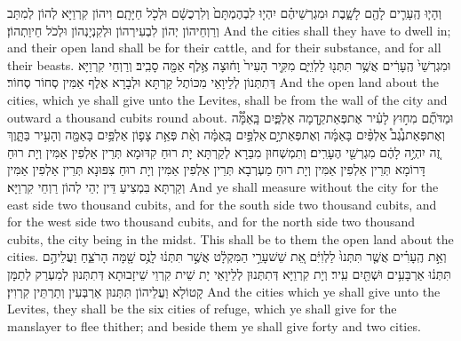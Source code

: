 {וְהָי֧וּ הֶֽעָרִ֛ים לָהֶ֖ם לָשָׁ֑בֶת וּמִגְרְשֵׁיהֶ֗ם יִהְי֤וּ לִבְהֶמְתָּם֙ וְלִרְכֻשָׁ֔ם וּלְכֹ֖ל חַיָּתָֽם׃}
{וִיהוֹן קִרְוַיָּא לְהוֹן לְמִתַּב וְרַוְחֵיהוֹן יְהוֹן לִבְעִירְהוֹן וּלְקִנְיָנְהוֹן וּלְכֹל חֵיוַתְהוֹן׃}
{And the cities shall they have to dwell in; and their open land shall be for their cattle, and for their substance, and for all their beasts.}{}
{וּמִגְרְשֵׁי֙ הֶֽעָרִ֔ים אֲשֶׁ֥ר תִּתְּנ֖וּ לַלְוִיִּ֑ם מִקִּ֤יר הָעִיר֙ וָח֔וּצָה אֶ֥לֶף אַמָּ֖ה סָבִֽיב׃}
{וְרַוְחֵי קִרְוַיָּא דְּתִתְּנוֹן לְלֵיוָאֵי מִכּוֹתֶל קַרְתָּא וּלְבָרָא אֶלֶף אַמִּין סְחוֹר סְחוֹר׃}
{And the open land about the cities, which ye shall give unto the Levites, shall be from the wall of the city and outward a thousand cubits round about.}{}
{וּמַדֹּתֶ֞ם מִח֣וּץ לָעִ֗יר אֶת\maqqaf פְּאַת\maqqaf קֵ֣דְמָה אַלְפַּ֪יִם בָּֽאַמָּ֟ה וְאֶת\maqqaf פְּאַת\maqqaf נֶ֩גֶב֩ אַלְפַּ֨יִם בָּאַמָּ֜ה וְאֶת\maqqaf פְּאַת\maqqaf יָ֣ם \legarmeh  אַלְפַּ֣יִם בָּֽאַמָּ֗ה וְאֵ֨ת פְּאַ֥ת צָפ֛וֹן אַלְפַּ֥יִם בָּאַמָּ֖ה וְהָעִ֣יר בַּתָּ֑וֶךְ זֶ֚ה יִהְיֶ֣ה לָהֶ֔ם מִגְרְשֵׁ֖י הֶעָרִֽים׃}
{וְתִמְשְׁחוּן מִבַּרָא לְקַרְתָּא יָת רוּחַ קִדּוּמָא תְּרֵין אַלְפִין אַמִּין וְיָת רוּחַ דָּרוֹמָא תְּרֵין אַלְפִין אַמִּין וְיָת רוּחַ מַעְרְבָא תְּרֵין אַלְפִין אַמִּין וְיָת רוּחַ צִפּוּנָא תְּרֵין אַלְפִין אַמִּין וְקַרְתָּא בִּמְצִיעַ דֵּין יְהֵי לְהוֹן רַוְחֵי קִרְוַיָּא׃}
{And ye shall measure without the city for the east side two thousand cubits, and for the south side two thousand cubits, and for the west side two thousand cubits, and for the north side two thousand cubits, the city being in the midst. This shall be to them the open land about the cities.}{}
{וְאֵ֣ת הֶֽעָרִ֗ים אֲשֶׁ֤ר תִּתְּנוּ֙ לַלְוִיִּ֔ם אֵ֚ת שֵׁשׁ\maqqaf עָרֵ֣י הַמִּקְלָ֔ט אֲשֶׁ֣ר תִּתְּנ֔וּ לָנֻ֥ס שָׁ֖מָּה הָרֹצֵ֑חַ וַעֲלֵיהֶ֣ם תִּתְּנ֔וּ אַרְבָּעִ֥ים וּשְׁתַּ֖יִם עִֽיר׃}
{וְיָת קִרְוַיָּא דְּתִתְּנוּן לְלֵיוָאֵי יָת שֵׁית קִרְוֵי שֵׁיזָבוּתָא דְּתִתְּנוּן לְמִעְרַק לְתַמָּן קָטוֹלָא וַעֲלֵיהוֹן תִּתְּנוּן אַרְבְּעִין וְתַרְתֵּין קִרְוִין׃}
{And the cities which ye shall give unto the Levites, they shall be the six cities of refuge, which ye shall give for the manslayer to flee thither; and beside them ye shall give forty and two cities.}{}

